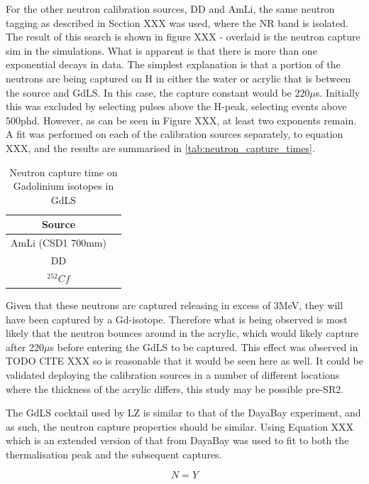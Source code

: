\par
For the other neutron calibration sources, DD and AmLi, the same neutron tagging as described in Section XXX was used, where the NR band is isolated.
The result of this search is shown in figure XXX - overlaid is the neutron capture sim in the simulations.
What is apparent is that there is more than one exponential decays in data.
The simplest explanation is that a portion of the neutrons are being captured on H in either the water or acrylic that is between the source and GdLS.
In this case, the capture constant would be 220$\mu$s.
Initially this was excluded by selecting pulses above the H-peak, selecting events above 500phd.
However, as can be seen in Figure XXX, at least two exponents remain.
A fit was performed on each of the calibration sources separately, to equation XXX, and the results are summarised in \autoref{tab:neutron_capture_times}.
\begin{table}[!htbp]
    \centering
    \begin{tabular}{c|c}
        Source            &  \\ \hline
        AmLi (CSD1 700mm) & \\ 
        DD                & \\
        ${}^{252}{Cf}$    &
    \end{tabular}
    \caption{Neutron capture time on Gadolinium isotopes in GdLS}
    \label{tab:neutron_capture_times}
\end{table}

Given that these neutrons are captured releasing in excess of 3MeV, they will have been captured by a Gd-isotope. 
Therefore what is being observed is most likely that the neutron bounces around in the acrylic, which would likely capture after 220$\mu$s before entering the GdLS to be captured.
This effect was observed in TODO CITE XXX so is reasonable that it would be seen here as well.
It could be validated deploying the calibration sources in a number of different locations where the thickness of the acrylic differs, this study may be possible pre-SR2.


\par
The GdLS cocktail used by LZ is similar to that of the DayaBay experiment, and as such, the neutron capture properties should be similar.
Using Equation XXX which is an extended version of that from DayaBay \cite{Dayabay_neutron_capture_fit_ref} was used to fit to both the thermalisation peak and the subsequent captures.

\begin{equation}
    N = Y
\end{equation}

